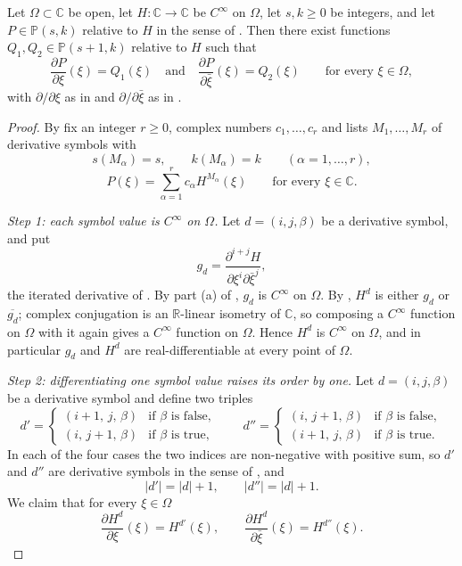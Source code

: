 \begin{lemma}
Let $\Omega\subset\mathbb{C}$ be open, let $H\colon\mathbb{C}\to\mathbb{C}$ be
$C^\infty$ on $\Omega$, let $s,k\ge0$ be integers, and let
$P\in\mathbb{P}(s,k)$ relative to $H$ in the sense of .  Then
there exist functions $Q_1,Q_2\in\mathbb{P}(s+1,k)$ relative to $H$ such that
\[
  \frac{\partial P}{\partial\xi}(\xi)=Q_1(\xi)
  \quad\text{and}\quad
  \frac{\partial P}{\partial\bar\xi}(\xi)=Q_2(\xi)
  \qquad\text{for every }\xi\in\Omega,
\]
with $\partial/\partial\xi$ as in  and $\partial/\partial\bar\xi$
as in .
\end{lemma}
\begin{proof}
By  fix an integer $r\ge0$, complex numbers $c_1,\dots,c_r$ and
lists $M_1,\dots,M_r$ of derivative symbols with
\begin{equation}\tag{1}
  s(M_\alpha)=s,\qquad k(M_\alpha)=k\qquad(\alpha=1,\dots,r),
\end{equation}
\begin{equation}\tag{2}
  P(\xi)=\sum_{\alpha=1}^{r}c_\alpha H^{M_\alpha}(\xi)\qquad\text{for every }\xi\in\mathbb{C}.
\end{equation}

\emph{Step 1: each symbol value is $C^\infty$ on $\Omega$.}  Let
$d=(i,j,\beta)$ be a derivative symbol, and put
\[
  g_d=\frac{\partial^{i+j}H}{\partial\xi^i\partial\bar\xi^j},
\]
the iterated derivative of .  By part (a) of
, $g_d$ is $C^\infty$ on $\Omega$.  By
, $H^d$ is either $g_d$ or $\overline{g_d}$; complex
conjugation is an $\mathbb{R}$-linear isometry of $\mathbb{C}$, so composing a
$C^\infty$ function on $\Omega$ with it again gives a $C^\infty$ function on
$\Omega$.  Hence $H^d$ is $C^\infty$ on $\Omega$, and in particular $g_d$ and
$H^d$ are real-differentiable at every point of $\Omega$.

\emph{Step 2: differentiating one symbol value raises its order by one.}  Let
$d=(i,j,\beta)$ be a derivative symbol and define two triples
\[
  d'=\begin{cases}(i+1,\,j,\,\beta)&\text{if $\beta$ is false},\\
                  (i,\,j+1,\,\beta)&\text{if $\beta$ is true},\end{cases}
  \qquad
  d''=\begin{cases}(i,\,j+1,\,\beta)&\text{if $\beta$ is false},\\
                   (i+1,\,j,\,\beta)&\text{if $\beta$ is true}.\end{cases}
\]
In each of the four cases the two indices are non-negative with positive sum,
so $d'$ and $d''$ are derivative symbols in the sense of
, and
\begin{equation}\tag{3}
  |d'|=|d|+1,\qquad |d''|=|d|+1 .
\end{equation}
We claim that for every $\xi\in\Omega$
\begin{equation}\tag{4}
  \frac{\partial H^{d}}{\partial\xi}(\xi)=H^{d'}(\xi),
  \qquad
  \frac{\partial H^{d}}{\partial\bar\xi}(\xi)=H^{d''}(\xi).
\end{equation}


\end{proof}
